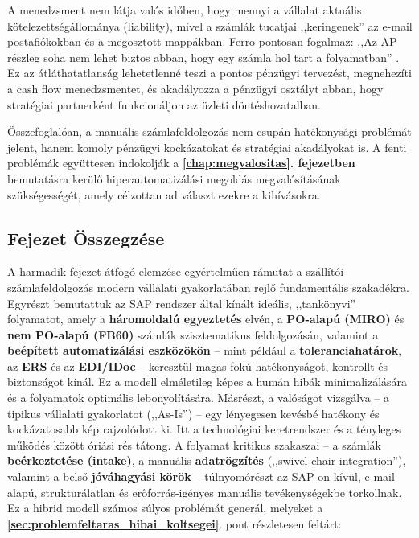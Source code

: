 \begin{enumerate}
    A menedzsment nem látja valós időben, hogy mennyi a vállalat aktuális kötelezettségállománya (liability), mivel a számlák tucatjai ,,keringenek'' az e-mail postafiókokban és a megosztott mappákban.
    Ferro pontosan fogalmaz: ,,Az AP részleg soha nem lehet biztos abban, hogy egy számla hol tart a folyamatban'' \cite{Edenredpay-5-Problems}. Ez az átláthatatlanság lehetetlenné teszi a pontos pénzügyi tervezést, megnehezíti a cash flow menedzsmentet, és akadályozza a pénzügyi osztályt abban, hogy stratégiai partnerként funkcionáljon az üzleti döntéshozatalban.
\end{enumerate}

Összefoglalóan, a manuális számlafeldolgozás nem csupán hatékonysági problémát jelent, hanem komoly pénzügyi kockázatokat és stratégiai akadályokat is.
A fenti problémák együttesen indokolják a \textbf{\ref{chap:megvalositas}. fejezetben} bemutatásra kerülő hiperautomatizálási megoldás megvalósításának szükségességét, amely célzottan ad választ ezekre a kihívásokra.


\subsection{Fejezet Összegzése}

A harmadik fejezet átfogó elemzése egyértelműen rámutat a szállítói számlafeldolgozás modern vállalati gyakorlatában rejlő fundamentális szakadékra.
Egyrészt bemutattuk az SAP rendszer által kínált ideális, ,,tankönyvi'' folyamatot, amely a \textbf{háromoldalú egyeztetés} elvén, a \textbf{PO-alapú (MIRO)} és \textbf{nem PO-alapú (FB60)} számlák szisztematikus feldolgozásán, valamint a \textbf{beépített automatizálási eszközökön} – mint például a \textbf{toleranciahatárok}, az \textbf{ERS} és az \textbf{EDI/IDoc} – keresztül magas fokú hatékonyságot, kontrollt és biztonságot kínál.
Ez a modell elméletileg képes a humán hibák minimalizálására és a folyamatok optimális lebonyolítására.
Másrészt, a valóságot vizsgálva – a tipikus vállalati gyakorlatot (,,As-Is'') – egy lényegesen kevésbé hatékony és kockázatosabb kép rajzolódott ki.
Itt a technológiai keretrendszer és a tényleges működés között óriási rés tátong.
A folyamat kritikus szakaszai – a számlák \textbf{beérkeztetése (intake)}, a manuális \textbf{adatrögzítés} (,,swivel-chair integration''), valamint a belső \textbf{jóváhagyási körök} – túlnyomórészt az SAP-on kívül, e-mail alapú, strukturálatlan és erőforrás-igényes manuális tevékenységekbe torkollnak.
Ez a hibrid modell számos súlyos problémát generál, melyeket a \textbf{\ref{sec:problemfeltaras_hibai_koltsegei}}. pont részletesen feltárt:

